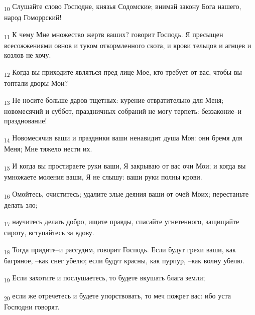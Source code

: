 \begin{tcolorbox}
\textsubscript{10} Слушайте слово Господне, князья Содомские; внимай закону Бога нашего, народ Гоморрский!
\end{tcolorbox}
\begin{tcolorbox}
\textsubscript{11} К чему Мне множество жертв ваших? говорит Господь. Я пресыщен всесожжениями овнов и туком откормленного скота, и крови тельцов и агнцев и козлов не хочу.
\end{tcolorbox}
\begin{tcolorbox}
\textsubscript{12} Когда вы приходите являться пред лице Мое, кто требует от вас, чтобы вы топтали дворы Мои?
\end{tcolorbox}
\begin{tcolorbox}
\textsubscript{13} Не носите больше даров тщетных: курение отвратительно для Меня; новомесячий и суббот, праздничных собраний не могу терпеть: беззаконие--и празднование!
\end{tcolorbox}
\begin{tcolorbox}
\textsubscript{14} Новомесячия ваши и праздники ваши ненавидит душа Моя: они бремя для Меня; Мне тяжело нести их.
\end{tcolorbox}
\begin{tcolorbox}
\textsubscript{15} И когда вы простираете руки ваши, Я закрываю от вас очи Мои; и когда вы умножаете моления ваши, Я не слышу: ваши руки полны крови.
\end{tcolorbox}
\begin{tcolorbox}
\textsubscript{16} Омойтесь, очиститесь; удалите злые деяния ваши от очей Моих; перестаньте делать зло;
\end{tcolorbox}
\begin{tcolorbox}
\textsubscript{17} научитесь делать добро, ищите правды, спасайте угнетенного, защищайте сироту, вступайтесь за вдову.
\end{tcolorbox}
\begin{tcolorbox}
\textsubscript{18} Тогда придите--и рассудим, говорит Господь. Если будут грехи ваши, как багряное, --как снег убелю; если будут красны, как пурпур, --как волну убелю.
\end{tcolorbox}
\begin{tcolorbox}
\textsubscript{19} Если захотите и послушаетесь, то будете вкушать блага земли;
\end{tcolorbox}
\begin{tcolorbox}
\textsubscript{20} если же отречетесь и будете упорствовать, то меч пожрет вас: ибо уста Господни говорят.
\end{tcolorbox}
